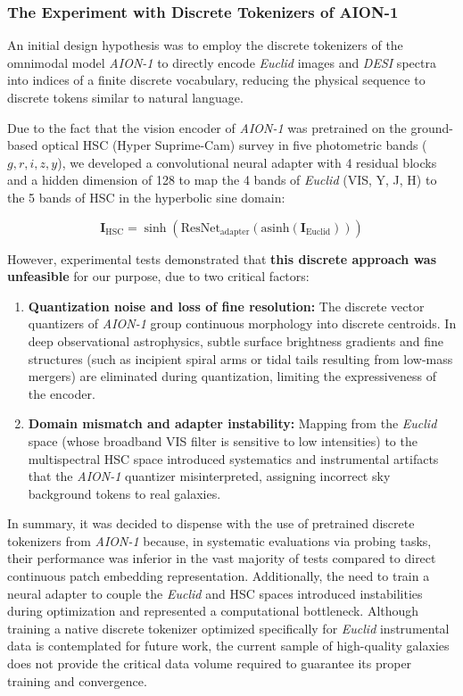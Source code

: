 \subsubsection{The Experiment with Discrete Tokenizers of AION-1}

An initial design hypothesis was to employ the discrete tokenizers of the omnimodal model \textit{AION-1} \autocite{ar:aion-1} to directly encode \textit{Euclid} images and \textit{DESI} spectra into indices of a finite discrete vocabulary, reducing the physical sequence to discrete tokens similar to natural language.

Due to the fact that the vision encoder of \textit{AION-1} was pretrained on the ground-based optical HSC (Hyper Suprime-Cam) survey in five photometric bands ($g, r, i, z, y$), we developed a convolutional neural adapter with 4 residual blocks and a hidden dimension of 128 to map the 4 bands of \textit{Euclid} (VIS, Y, J, H) to the 5 bands of HSC in the hyperbolic sine domain:

\begin{equation}
\mathbf{I}_{\text{HSC}} = \sinh\left(\text{ResNet}_{\text{adapter}}\left(\text{asinh}\left(\mathbf{I}_{\text{Euclid}}\right)\right)\right)
\label{eq:hsc_adapter}
\end{equation}

However, experimental tests demonstrated that \textbf{this discrete approach was unfeasible} for our purpose, due to two critical factors:

\begin{enumerate}
\item \textbf{Quantization noise and loss of fine resolution:} The discrete vector quantizers of \textit{AION-1} group continuous morphology into discrete centroids. In deep observational astrophysics, subtle surface brightness gradients and fine structures (such as incipient spiral arms or tidal tails resulting from low-mass mergers) are eliminated during quantization, limiting the expressiveness of the encoder.
\item \textbf{Domain mismatch and adapter instability:} Mapping from the \textit{Euclid} space (whose broadband VIS filter is sensitive to low intensities) to the multispectral HSC space introduced systematics and instrumental artifacts that the \textit{AION-1} quantizer misinterpreted, assigning incorrect sky background tokens to real galaxies.
\end{enumerate}

In summary, it was decided to dispense with the use of pretrained discrete tokenizers from \textit{AION-1} because, in systematic evaluations via probing tasks, their performance was inferior in the vast majority of tests compared to direct continuous patch embedding representation. Additionally, the need to train a neural adapter to couple the \textit{Euclid} and HSC spaces introduced instabilities during optimization and represented a computational bottleneck. Although training a native discrete tokenizer optimized specifically for \textit{Euclid} instrumental data is contemplated for future work, the current sample of high-quality galaxies does not provide the critical data volume required to guarantee its proper training and convergence.

